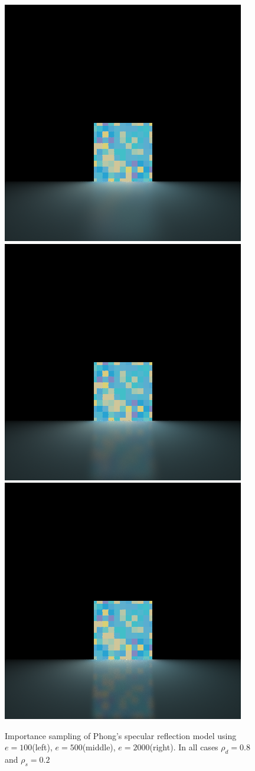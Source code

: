 \begin{figure}
\centering
\includegraphics[width=0.3\linewidth]{./img/ph3}
\includegraphics[width=0.3\linewidth]{./img/ph2}
\includegraphics[width=0.3\linewidth]{./img/ph1}
\caption{Importance sampling of Phong's specular reflection model using $e = 100$(left), $e = 500$(middle), $e = 2000$(right). In all cases $\rho_d =0.8$ and $\rho_s = 0.2$}
\label{fig:phongRichter}
\end{figure}
